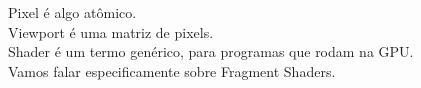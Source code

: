 \documentclass[preview]{standalone}
\begin{document}
Pixel é algo atômico.\\Viewport é uma matriz de pixels.\\Shader é um termo genérico,
 para programas que rodam na GPU.\\Vamos falar especificamente sobre Fragment Shaders.\\
\end{document}
